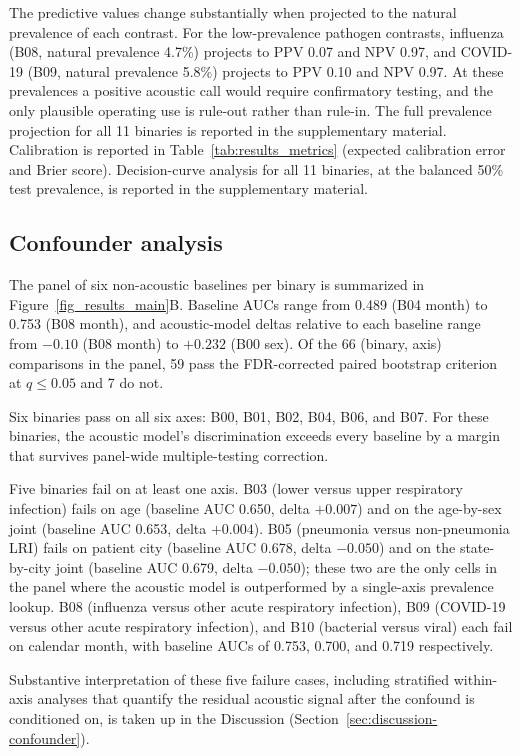 \documentclass[utf8]{FrontiersinHarvard} %
\begin{document}
The predictive values change substantially when projected to the natural prevalence of each contrast. For the low-prevalence pathogen contrasts, influenza (B08, natural prevalence 4.7\%) projects to PPV 0.07 and NPV 0.97, and COVID-19 (B09, natural prevalence 5.8\%) projects to PPV 0.10 and NPV 0.97. At these prevalences a positive acoustic call would require confirmatory testing, and the only plausible operating use is rule-out rather than rule-in. The full prevalence projection for all 11 binaries is reported in the supplementary material. Calibration is reported in Table~\ref{tab:results_metrics} (expected calibration error and Brier score). Decision-curve analysis for all 11 binaries, at the balanced 50\% test prevalence, is reported in the supplementary material.

\subsection{Confounder analysis}
\label{sec:results-confounder}

The panel of six non-acoustic baselines per binary is summarized in Figure~\ref{fig_results_main}B. Baseline AUCs range from 0.489 (B04 month) to 0.753 (B08 month), and acoustic-model deltas relative to each baseline range from $-0.10$ (B08 month) to $+0.232$ (B00 sex). Of the 66 (binary, axis) comparisons in the panel, 59 pass the FDR-corrected paired bootstrap criterion at $q \leq 0.05$ and 7 do not.

Six binaries pass on all six axes: B00, B01, B02, B04, B06, and B07. For these binaries, the acoustic model's discrimination exceeds every baseline by a margin that survives panel-wide multiple-testing correction.

Five binaries fail on at least one axis. B03 (lower versus upper respiratory infection) fails on age (baseline AUC 0.650, delta $+0.007$) and on the age-by-sex joint (baseline AUC 0.653, delta $+0.004$). B05 (pneumonia versus non-pneumonia LRI) fails on patient city (baseline AUC 0.678, delta $-0.050$) and on the state-by-city joint (baseline AUC 0.679, delta $-0.050$); these two are the only cells in the panel where the acoustic model is outperformed by a single-axis prevalence lookup. B08 (influenza versus other acute respiratory infection), B09 (COVID-19 versus other acute respiratory infection), and B10 (bacterial versus viral) each fail on calendar month, with baseline AUCs of 0.753, 0.700, and 0.719 respectively.

Substantive interpretation of these five failure cases, including stratified within-axis analyses that quantify the residual acoustic signal after the confound is conditioned on, is taken up in the Discussion (Section~\ref{sec:discussion-confounder}).
\end{document}
